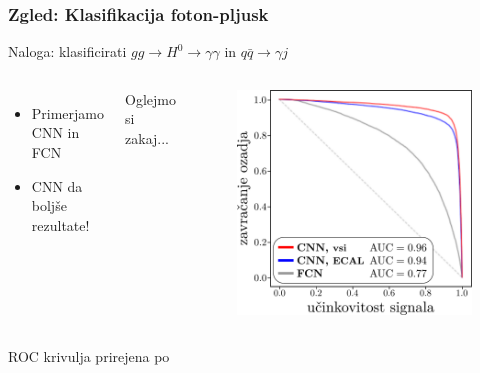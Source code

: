 \documentclass[14pt, t]{beamer}
\begin{document}
\begin{frame}
    \frametitle{Zgled: Klasifikacija foton-pljusk}

    Naloga: klasificirati $ gg \to H^{0} \to \gamma \gamma $ in $ q \bar{q} \to \gamma j $
    \begin{columns}

        \vspace{3mm}
        \begin{itemize}
    
            \item Primerjamo CNN in FCN

            \item CNN da boljše rezultate!

        \end{itemize}
        \vspace{3mm}
        Oglejmo si zakaj...


        \begin{figure}[htb!]
            \centering
            \includegraphics[width=\columnwidth]{raster/raster-svg-slo/roc.pdf}
        \end{figure}
        
    \end{columns}
    {\tiny ROC krivulja prirejena po \cite{andrews-higgs}}

\end{frame}
\end{document}

